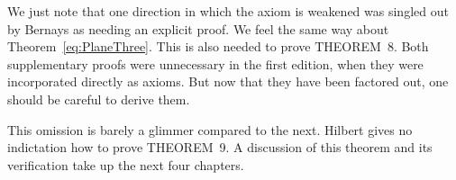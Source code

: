 We just note that one direction in which the axiom is weakened  was singled out by Bernays as needing an explicit proof. We feel the same way about Theorem~\ref{eq:PlaneThree}. This is also needed to prove THEOREM~8. Both supplementary proofs were unnecessary in the first edition, when they were incorporated directly as axioms. But now that they have been factored out, one should be careful to derive them.

This omission is barely a glimmer compared to the next. Hilbert gives no indictation how to prove THEOREM~9. A discussion of this theorem and its verification take up the next four chapters.


